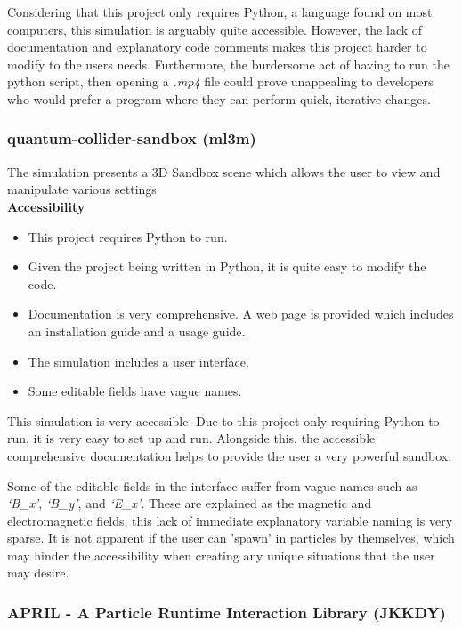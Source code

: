Considering that this project only requires Python, a language found on most computers, this simulation is arguably quite accessible. However, the lack of documentation and explanatory code comments makes this project harder to modify to the users needs.
Furthermore, the burdersome act of having to run the python script, then opening a \textit{.mp4} file could prove unappealing to developers who would prefer a program where they can perform quick, iterative changes.

\subsubsection*{quantum-collider-sandbox (ml3m)}

The simulation  presents a 3D Sandbox scene which allows the user to view and manipulate various settings
\\
\textbf{Accessibility}

\begin{itemize}
    \item This project requires Python to run.
    \item Given the project being written in Python, it is quite easy to modify the code.
    \item Documentation is very comprehensive. A web page is provided which includes an installation guide and a usage guide.
    \item The simulation includes a user interface.
    \item Some editable fields have vague names.
\end{itemize}

This simulation is very accessible.
Due to this project only requiring Python to run, it is very easy to set up and run. Alongside this, the accessible comprehensive documentation helps to provide the user a very powerful sandbox.

Some of the editable fields in the interface suffer from vague names such as \textit{`B\_x'}, \textit{`B\_y'}, and \textit{`E\_x'}. These are explained as the magnetic and electromagnetic fields, this lack of immediate explanatory variable naming is very sparse.
It is not apparent if the user can 'spawn' in particles by themselves, which may hinder the accessibility when creating any unique situations that the user may desire.

\subsubsection*{APRIL \-- A Particle Runtime Interaction Library (JKKDY)}

